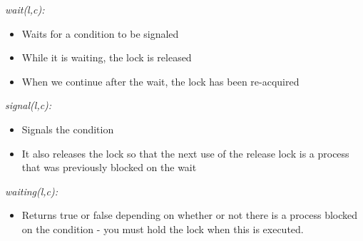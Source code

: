 \documentclass{hw}
\begin{document}
\emph{wait(l,c):}
\begin{itemize}
  \item Waits for a condition to be signaled
  \item While it is waiting, the lock is released
  \item When we continue after the wait, the lock has been re-acquired
\end{itemize}

\emph{signal(l,c):}
\begin{itemize}
  \item Signals the condition
  \item It also releases the lock so that the next use of the release lock is a 
    process that was previously blocked on the wait
\end{itemize}

\emph{waiting(l,c):}
\begin{itemize}
  \item Returns true or false depending on whether or not there is a process
    blocked on the condition - you must hold the lock when this is executed.
\end{itemize}
\end{document}
